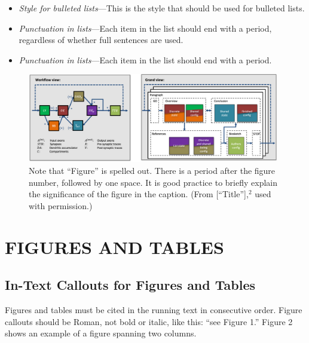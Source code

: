 \documentclass{IEEEcsmag}
\begin{document}
\begin{itemize}
\item[{\ieeeguilsinglright}] {\it Style for bulleted lists}---This is the style that should be used for bulleted lists.
	
\item[{\ieeeguilsinglright}] {\it Punctuation in lists}---Each item in the list should end with a period, regardless of whether full sentences are used.

\item[{\ieeeguilsinglright}] {\it Punctuation in lists}---Each item in the list should  end with a period.

\end{itemize}\vspace*{3pt}




\begin{figure}
\centerline{\includegraphics[width=26pc]{fig2.jpg}}
\caption{Note that ``Figure'' is spelled out. There is a period after the figure number, followed by one space. It is good practice to briefly explain the significance of the figure in the caption. (From [``Title''],$^2$ used with permission.)}\vspace*{-5pt}
\end{figure}




\section{FIGURES AND TABLES}

\subsection{In-Text Callouts for Figures and Tables}

Figures and tables must be cited in the running text in consecutive order. Figure callouts should be Roman, not bold or italic, like this: ``see Figure 1.'' Figure 2 shows an example of a figure spanning two columns.
\end{document}
